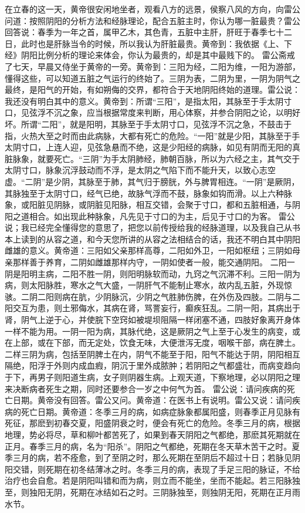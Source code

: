 \documentclass[a4paper,12pt,UTF8,twoside]{ctexbook}
\begin{document}
在立春的这一天，黄帝很安闲地坐者，观看八方的远景，侯察八风的方向，向雷公问道：按照阴阳的分析方法和经脉理论，配合五脏主时，你认为哪一脏最贵？雷公回答说：春季为一年之首，属甲乙木，其色青，五脏中主肝，肝旺于春季七十二日，此时也是肝脉当令的时候，所以我认为肝脏最贵。黄帝到：我依据《上、下经》阴阳比例分析的理论来体会，你认为最贵的，却是其中最贱下的。
雷公斋戒了七天，早晨又侍坐于黄帝的一旁。黄帝到：三阳为经，二阳为维，一阳为游部，懂得这些，可以知道五脏之气运行的终始了。三阴为表，二阴为里，一阴为阴气之最终，是阳气的开始，有如朔侮的交界，都符合于天地阴阳终始的道理。雷公说：我还没有明白其中的意义。黄帝到：所谓“三阳”，是指太阳，其脉至于手太阴寸口，见弦浮不沉之象，应当根据常度来判断，用心体察，并参合阴阳之论，以明好坏。所谓“二阳”，就是阳明，其脉至于手太阴寸口，见弦浮不沉之急，不鼓击于指，火热大至之时而由此病脉，大都有死亡的危险。“一阳”就是少阳，其脉至于手太阴寸口，上连人迎，见弦急悬而不绝，这是少阳经的病脉，如见有阴而无阳的真脏脉象，就要死亡。“三阴”为手太阴肺经，肺朝百脉，所以为六经之主，其气交于太阴寸口，脉象沉浮鼓动而不浮，是太阴之气陷下而不能升天，以致心志空虚。“二阴”是少阴，其脉至于肺，其气归于膀胱，外与脾胃相连。“一阴”是厥阴，其脉独至于太阴寸口，经气已绝，故脉气浮而不鼓，脉象如钩而滑。以上六种脉象，或阳脏见阴脉，或阴脏见阳脉，相互交错，会聚于寸口，都和五脏相通，与阴阳之道相合。如出现此种脉象，凡先见于寸口的为主，后见于寸口的为客。
雷公说；我已经完全懂得您的意思了，把您以前传授给我的经脉道理，以及我自己从书本上读到的从容之道，和今天您所讲的从容之法相结合的话，我还不明白其中阴阳雌雄的意义。黄帝道：三阳如父亲那样高尊，二阳如外卫，一阳如枢纽；三阴如母亲那样善于养育，二阴如雌雄那样内守，一阴如使者一般，能交通阴阳。
二阳一阴是阳明主病，二阳不胜一阴，则阳明脉软而动，九窍之气沉滞不利。三阳一阴为病，则太阳脉胜，寒水之气大盛，一阴肝气不能制止寒水，故内乱五脏，外现惊骇。二阴二阳则病在肮，少阴脉沉，少阴之气胜肺伤脾，在外伤及四肢。二阴与二阳交互为患，则土邪侮水，其病在肾，骂詈妄行，癫疾狂乱。二阴一阳，其病出于肾，阴气上逆于心，并使脘下空窍如被堤坝阻隔一样闭塞不通，四肢好象离开身体一样不能为用。一阴一阳为病，其脉代绝，这是厥阴之气上至于心发生的病变，或在上部，或在下部，而无定处，饮食无味，大便泄泻无度，咽喉干部，病在脾土。二样三阴为病，包括至阴脾土在内，阴气不能至于阳，阳气不能达于阴，阴阳相互隔绝，阳浮于外则内成血瘕，阴沉于里外成脓肿；若阴阳之气都盛壮，而病变趋向于下，再男子则阳道生病，女子则阴器生病。上观天道，下察地理，必以阴阳之理来决断病者死生之期，同时还要参合一岁之中何气为首。
雷公说：请问疾病的死亡日期。黄帝没有回答。雷公又问。黄帝道：在医书上有说明。雷公又说：请问疾病的死亡日期。黄帝道：冬季三月的病，如病症脉象都属阳盛，则春季正月见脉有死征，那麽到初春交夏，阳盛阴衰之时，便会有死亡的危险。冬季三月的病，根据地理，势必将尽，草和柳叶都苦死了，如果到春天阴阳之气都绝，那麽其死期就在正月。春季三月的病，名为“阳杀”。阴阳之气都绝，死期在冬天草木苦干之时。夏季三月的病，若不痊愈，到了至阴之时，那么死期在至阴后不超过十日；若脉见阴阳交错，则死期在初冬结薄冰之时。冬季三月的病，表现了手足三阳的脉证，不给治疗也会自愈。若是阴阳叫错和而为病，则立而不能坐，坐而不能起。若三阳脉独至，则独阳无阴，死期在冰结如石之时。三阴脉独至，则独阴无阳，死期在正月雨水节。
\end{document}
